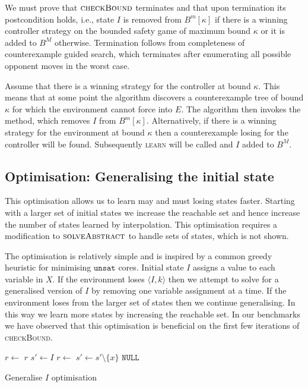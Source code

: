We must prove that $\textsc{checkBound}$ terminates and that upon termination
its postcondition holds, i.e., state $I$ is removed from $B^m[\kappa]$ if there
is a winning controller strategy on the bounded safety game of maximum bound
$\kappa$ or it is added to $B^M$ otherwise. Termination follows from
completeness of counterexample guided search, which terminates after
enumerating all possible opponent moves in the worst case.

Assume that there is a winning strategy for the controller at bound $\kappa$.
This means that at some point the algorithm discovers a counterexample tree of
bound $\kappa$ for which the environment cannot force into $E$. The algorithm
then invokes the \textsc{} method, which removes $I$ from
$B^m[\kappa]$.  Alternatively, if there is a winning strategy for the
environment at bound $\kappa$ then a counterexample losing for the controller
will be found.  Subsequently \textsc{learn} will be called and $I$ added to
$B^M$.

\subsection{Optimisation: Generalising the initial state}

This optimisation allows us to learn may and must losing states faster.
Starting with a larger set of initial states we increase the reachable set and
hence increase the number of states learned by interpolation. This optimisation
requires a modification to $\textsc{solveAbstract}$ to handle sets of states,
which is not shown.

The optimisation is relatively simple and is inspired by a common greedy
heuristic for minimising $\texttt{unsat}$ cores. Initial state $I$ assigns a value to
each variable in $X$. If the environment loses $\langle I, k
\rangle$ then we attempt to solve for a generalised version of $I$ by removing
one variable assignment at a time. If the environment loses from the larger set of
states then we continue generalising. In this way we learn more
states by increasing the reachable set. In our benchmarks we have observed that
this optimisation is beneficial on the first few iterations of
\textsc{checkBound}.

\begin{algorithm}
    \begin{algorithmic}
            \State $r \gets $ 
             \Return $r$ \EndIIf
            \State $s' \gets I$
            \State $r \gets$  
                 $s' \gets s' \setminus \{x\}$ \EndIIf {}
            \EndFor
            \State \Return $\texttt{NULL}$
        \EndFunction
    \end{algorithmic}
    \caption{Generalise $I$ optimisation}
    \label{alg:opt1}
\end{algorithm}

